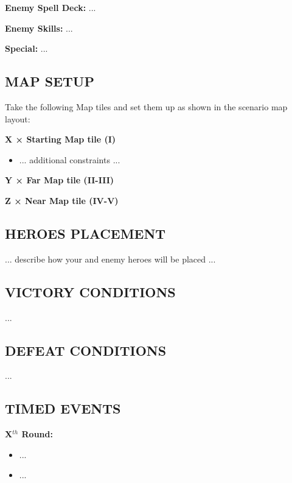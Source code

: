 \begin{multicols*}{2}
\textbf{Enemy Spell Deck:} ...

\textbf{Enemy Skills:} ...

\textbf{Special:} ...

\subsection*{\MakeUppercase{Map setup}}

Take the following Map tiles and set them up as shown in the scenario map layout:

\textbf{X × Starting Map tile (I)}
\begin{itemize}
    \item ... additional constraints ...
\end{itemize}

\textbf{Y × Far Map tile (II-III)}

\textbf{Z × Near Map tile (IV-V)}

\subsection*{\MakeUppercase{Heroes placement}}

... describe how your and enemy heroes will be placed ...

\subsection*{\MakeUppercase{Victory Conditions}}
...

\subsection*{\MakeUppercase{Defeat Conditions}}
...

\subsection*{\MakeUppercase{Timed Events}}

\textbf{X$^{th}$ Round:}
\begin{itemize}
  \item ...
  \item ...
\end{itemize}

%
%
% 


\end{multicols*}
